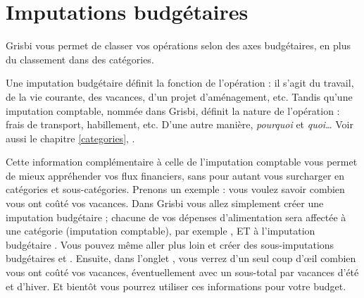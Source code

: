 
\chapter{Imputations budgétaires\label{budgetarylines}}

Grisbi vous permet de classer vos opérations selon des axes budgétaires, en plus du classement dans des catégories. 

Une imputation budgétaire définit la fonction de l'opération : il s'agit du travail, de la vie courante, des vacances, d'un projet d'aménagement, etc. Tandis qu'une imputation comptable, nommée  dans Grisbi, définit la nature de  l'opération : frais de transport, habillement, etc. D'une autre manière, \emph{pourquoi} et \emph{quoi}\ldots{ } Voir aussi le chapitre \vref{categories}, .

Cette information complémentaire à celle de l'imputation comptable vous permet de mieux appréhender vos flux financiers, sans pour autant vous surcharger en catégories et sous-catégories. Prenons un exemple : vous voulez savoir combien vous ont coûté vos vacances. Dans Grisbi vous allez simplement créer une imputation budgétaire  ; chacune de vos dépenses d'alimentation sera affectée à une catégorie (imputation comptable), par exemple , ET à l'imputation budgétaire . Vous pouvez même aller plus loin et créer des sous-imputations budgétaires  et . Ensuite, dans l'onglet , vous verrez d'un seul coup d'\oe il combien vous ont coûté vos vacances, éventuellement avec un sous-total par vacances d'été et d'hiver. Et bientôt vous pourrez utiliser ces informations pour votre  budget.


